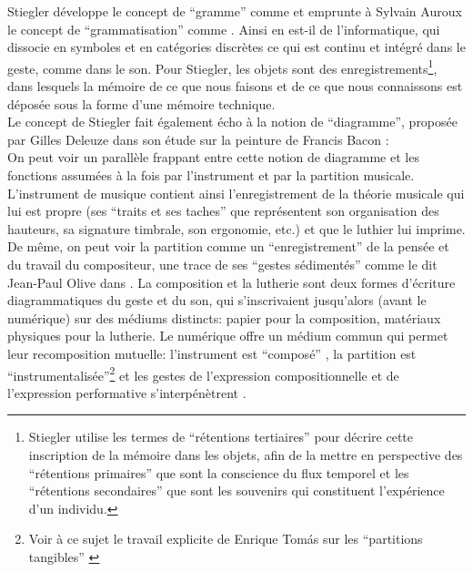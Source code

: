\indent Stiegler développe le concept de ``gramme'' comme  et emprunte à Sylvain Auroux \cite{auroux_revolution_1994} le concept de ``grammatisation'' comme . Ainsi en est-il de l'informatique, qui dissocie en symboles et en catégories discrètes ce qui est continu et intégré dans le geste, comme dans le son. Pour Stiegler, les objets sont des enregistrements\footnote{Stiegler utilise les termes de ``rétentions tertiaires'' pour décrire cette inscription de la mémoire dans les objets, afin de la mettre en perspective des ``rétentions primaires'' que sont la conscience du flux temporel et les ``rétentions secondaires'' que sont les souvenirs qui constituent l'expérience d'un individu.}, dans lesquels la mémoire de ce que nous faisons et de ce que nous connaissons est déposée sous la forme d'une mémoire technique.\\
\indent Le concept de Stiegler fait également écho à la notion de ``diagramme'', proposée par Gilles Deleuze dans son étude sur la peinture de Francis Bacon \cite{deleuze_francis_1981} : \\
\indent On peut voir un parallèle frappant entre cette notion de diagramme et les fonctions assumées à la fois par l'instrument et par la partition musicale. L'instrument de musique contient ainsi l'enregistrement de la théorie musicale qui lui est propre (ses ``traits et ses taches'' que représentent son organisation des hauteurs, sa signature timbrale, son ergonomie, etc.) et que le luthier lui imprime. De même, on peut voir la partition comme un ``enregistrement'' de la pensée et du travail du compositeur, une trace de ses ``gestes sédimentés'' comme le dit Jean-Paul Olive dans \cite{olive_expression_2013}. La composition et la lutherie sont deux formes d’écriture diagrammatiques du geste et du son, qui s’inscrivaient jusqu’alors (avant le numérique) sur des médiums distincts: papier pour la composition, matériaux physiques pour la lutherie. Le numérique offre un médium commun qui permet leur recomposition mutuelle: l'instrument est ``composé'' \cite{schnell_introducing_2002}, la partition est ``instrumentalisée''\footnote{Voir à ce sujet le travail explicite de Enrique Tomás sur les ``partitions tangibles'' \cite{tomas_tangible_2014}} et les gestes de l'expression compositionnelle et de l'expression performative s'interpénètrent \cite{dobrian_e_2006}.\\

